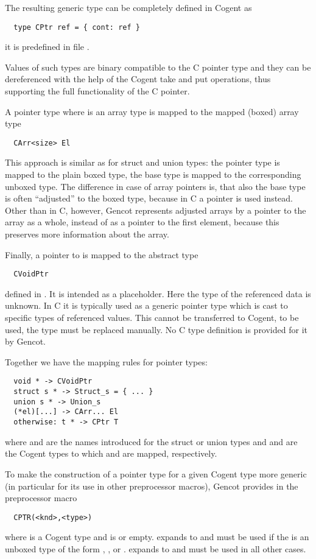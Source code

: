 The resulting generic type can be completely defined in Cogent as
\begin{verbatim}
  type CPtr ref = { cont: ref }
\end{verbatim}
it is predefined in file .

Values of such types are binary compatible to the C pointer type and they can be dereferenced with the help of
the Cogent take and put operations, thus supporting the full functionality of the C pointer.

A pointer type  where  is an array type is mapped to the mapped (boxed) array type 
\begin{verbatim}
  CArr<size> El
\end{verbatim}
This approach is similar as for struct and union types: the pointer type is mapped to the plain boxed type,
the base type is mapped to the corresponding unboxed type. The difference in case of array pointers is, that also the base
type is often ``adjusted'' to the boxed type, because in C a pointer is used instead. Other than in C, however, Gencot
represents adjusted arrays by a pointer to the array as a whole, instead of as a pointer to the first element, because
this preserves more information about the array.

Finally, a pointer to  is mapped to the abstract type
\begin{verbatim}
  CVoidPtr
\end{verbatim}
defined in .
It is intended as a placeholder. Here the type of the referenced data is unknown. In C it is typically used 
as a generic pointer type which is cast to specific types of referenced values. This cannot be transferred to
Cogent, to be used, the type must be replaced manually. No C type definition is provided for it by Gencot.

Together we have the mapping rules for pointer types:
\begin{verbatim}
  void * -> CVoidPtr
  struct s * -> Struct_s = { ... }
  union s * -> Union_s
  (*el)[...] -> CArr... El
  otherwise: t * -> CPtr T
\end{verbatim}
where  and  are the names introduced for the struct or union types and  
and  are the Cogent types to which  and  are mapped, respectively.

To make the construction of a pointer type for a given Cogent type more generic (in particular for its use 
in other preprocessor macros), Gencot provides in  the preprocessor macro
\begin{verbatim}
  CPTR(<knd>,<type>)
\end{verbatim}
where  is a Cogent type and  is  or empty.  expands to  and
must be used if the  is an unboxed type of the form , , or
.  expands to  and must be used in all other cases.

